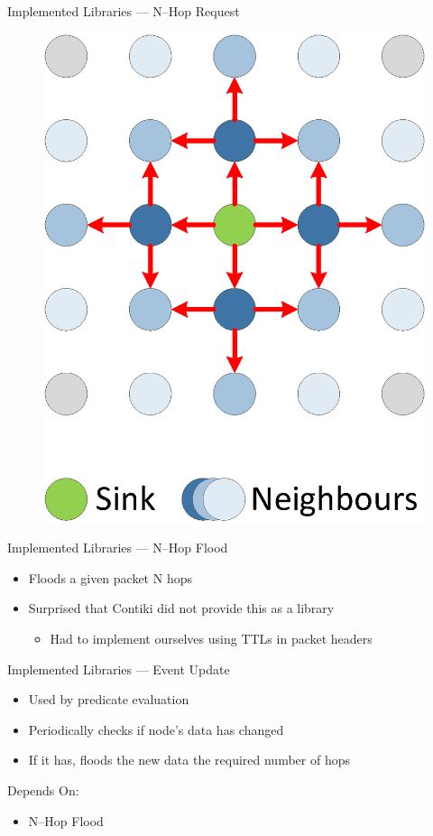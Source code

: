 \documentclass[usenames,dvipsnames]{beamer}
\begin{document}
\begin{frame}{Implemented Libraries --- N--Hop Request}
\begin{figure}[H]
\includegraphics[scale=0.3]{../Report/Diagrams/2-hop-flooding.eps}
\end{figure}
\end{frame}

\begin{frame}{Implemented Libraries --- N--Hop Flood}
	\begin{itemize}
		\item Floods a given packet N hops
		\item Surprised that Contiki did not provide this as a library
			\begin{itemize}
				\item Had to implement ourselves using TTLs in packet headers
			\end{itemize}
	\end{itemize}
\end{frame}

\begin{frame}{Implemented Libraries --- Event Update}
	\begin{itemize}
		\item Used by predicate evaluation
		\item Periodically checks if node's data has changed
		\item If it has, floods the new data the required number of hops
	\end{itemize}
\vspace{1em}
Depends On:
	\begin{itemize}
		\item N--Hop Flood
	\end{itemize}
\end{frame}
\end{document}
